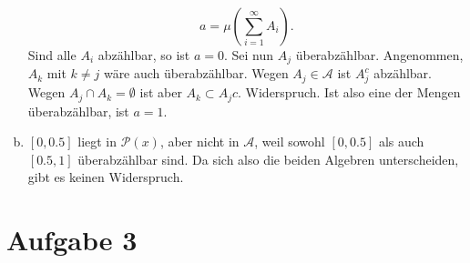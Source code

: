 \documentclass{article}
\begin{document}
\begin{enumerate}[(a)]
            \[
                a = \mu\left(\sum_{i = 1}^\infty A_i\right).
            \]
            Sind alle $A_i$ abzählbar, so ist $a = 0$. Sei nun $A_j$ überabzählbar. Angenommen, $A_k$ mit $k\neq j$ wäre auch überabzählbar. Wegen $A_j \in \mathcal{A}$ ist $A_j^c$ abzählbar. Wegen $A_j \cap A_k = \emptyset$ ist aber $A_k \subset A_j   c$. Widerspruch. Ist also eine der Mengen überabzählbar, ist $a = 1$.
        \item $[0,0.5]$ liegt in $\mathcal{P}(x)$, aber nicht in $\mathcal{A}$, weil sowohl $[0,0.5]$ als auch $[0.5,1]$ überabzählbar sind. Da sich also die beiden Algebren unterscheiden, gibt es keinen Widerspruch.
    \end{enumerate}
    \section*{Aufgabe 3}
\end{document}
